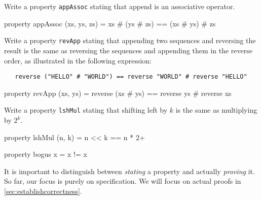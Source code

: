 \begin{Exercise}\label{ex:thm:1}
  Write a property {\tt appAssoc} stating that append is an
  associative operator.\indAppend
\end{Exercise}
\begin{Answer}\indAppend
\begin{code}
  property appAssoc (xs, ys, zs) = xs # (ys # zs) == (xs # ys) # zs
\end{code}
\end{Answer}

\begin{Exercise}\label{ex:thm:2}
  Write a property {\tt revApp} stating that appending two sequences
  and reversing the result is the same as reversing the sequences and
  appending them in the reverse order, as illustrated in the following
  expression:\indReverse\indAppend
\begin{Verbatim}
   reverse ("HELLO" # "WORLD") == reverse "WORLD" # reverse "HELLO"
\end{Verbatim}
\end{Exercise}
\begin{Answer}\indReverse\indAppend
\begin{code}
  property revApp (xs, ys) = reverse (xs # ys)
                             == reverse ys # reverse xs
\end{code}
\end{Answer}

\begin{Exercise}\label{ex:thm:3}
  Write a property {\tt lshMul} stating that shifting left by $k$ is
  the same as multiplying by $2^k$.
\end{Exercise}
\begin{Answer}
\begin{code}
  property lshMul (n, k) = n << k == n * 2^^k
\end{code}
\end{Answer}

\begin{code}
  property bogus x = x != x
\end{code}
It is important to distinguish between \emph{stating} a property and
actually \emph{proving} it. So far, our focus is purely on
specification. We will focus on actual proofs in
\autoref{sec:establishcorrectness}.

